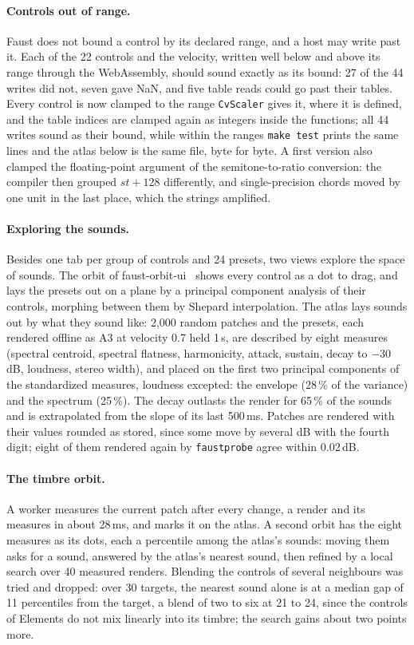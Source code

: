 \documentclass[10pt,a4paper,twocolumn]{article}
\newcommand{\probe}{\texttt{faustprobe}}
\newcommand{\code}[1]{\texttt{#1}}
\begin{document}
\paragraph{Controls out of range.} Faust does not bound a control by its declared range, and a host may write past it. Each of the 22 controls and the velocity, written well below and above its range through the WebAssembly, should sound exactly as its bound: 27 of the 44 writes did not, seven gave NaN, and five table reads could go past their tables. Every control is now clamped to the range \code{CvScaler} gives it, where it is defined, and the table indices are clamped again as integers inside the functions; all 44 writes sound as their bound, while within the ranges \code{make test} prints the same lines and the atlas below is the same file, byte for byte. A first version also clamped the floating-point argument of the semitone-to-ratio conversion: the compiler then grouped $st + 128$ differently, and single-precision chords moved by one unit in the last place, which the strings amplified.

\paragraph{Exploring the sounds.} Besides one tab per group of controls and 24 presets, two views explore the space of sounds. The orbit of faust-orbit-ui~\cite{faustorbitui} shows every control as a dot to drag, and lays the presets out on a plane by a principal component analysis of their controls, morphing between them by Shepard interpolation. The atlas lays sounds out by what they sound like: 2,000 random patches and the presets, each rendered offline as A3 at velocity 0.7 held 1\,s, are described by eight measures (spectral centroid, spectral flatness, harmonicity, attack, sustain, decay to $-30$\,dB, loudness, stereo width), and placed on the first two principal components of the standardized measures, loudness excepted: the envelope (28\,\% of the variance) and the spectrum (25\,\%). The decay outlasts the render for 65\,\% of the sounds and is extrapolated from the slope of its last 500\,ms. Patches are rendered with their values rounded as stored, since some move by several dB with the fourth digit; eight of them rendered again by \probe{} agree within 0.02\,dB.

\paragraph{The timbre orbit.} A worker measures the current patch after every change, a render and its measures in about 28\,ms, and marks it on the atlas. A second orbit has the eight measures as its dots, each a percentile among the atlas's sounds: moving them asks for a sound, answered by the atlas's nearest sound, then refined by a local search over 40 measured renders. Blending the controls of several neighbours was tried and dropped: over 30 targets, the nearest sound alone is at a median gap of 11 percentiles from the target, a blend of two to six at 21 to 24, since the controls of Elements do not mix linearly into its timbre; the search gains about two points more.
\end{document}
